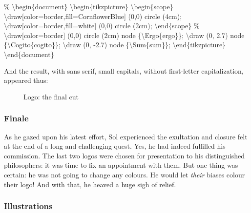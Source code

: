 \documentclass[
  a4paper,
]{article}
\newenvironment{Shaded}{\begin{snugshade}}{\end{snugshade}}
\newcommand{\CommentTok}[1]{\textcolor[rgb]{0.50,0.62,0.50}{#1}}
\newcommand{\ExtensionTok}[1]{\textcolor[rgb]{0.80,0.80,0.80}{#1}}
\newcommand{\FunctionTok}[1]{\textcolor[rgb]{0.94,0.94,0.56}{#1}}
\newcommand{\KeywordTok}[1]{\textcolor[rgb]{0.94,0.87,0.69}{#1}}
\newcommand{\NormalTok}[1]{\textcolor[rgb]{0.80,0.80,0.80}{#1}}
\begin{document}
\begin{Shaded}
\begin{Highlighting}[]
\CommentTok{\%}
\KeywordTok{\textbackslash{}begin}\NormalTok{\{}\ExtensionTok{document}\NormalTok{\}}
\KeywordTok{\textbackslash{}begin}\NormalTok{\{}\ExtensionTok{tikzpicture}\NormalTok{\}}
\KeywordTok{\textbackslash{}begin}\NormalTok{\{}\ExtensionTok{scope}\NormalTok{\}}
\FunctionTok{\textbackslash{}draw}\NormalTok{[color=border,fill=CornflowerBlue] (0,0) circle (4cm);}
\FunctionTok{\textbackslash{}draw}\NormalTok{[color=border,fill=white] (0,0) circle (2cm);}
\KeywordTok{\textbackslash{}end}\NormalTok{\{}\ExtensionTok{scope}\NormalTok{\}}
\CommentTok{\%}
\FunctionTok{\textbackslash{}draw}\NormalTok{[color=border] (0,0) circle (2cm) node \{}\FunctionTok{\textbackslash{}Ergo}\NormalTok{\{ergo\}\};}
\FunctionTok{\textbackslash{}draw}\NormalTok{ (0, 2.7) node \{}\FunctionTok{\textbackslash{}Cogito}\NormalTok{\{cogito\}\};}
\FunctionTok{\textbackslash{}draw}\NormalTok{ (0, {-}2.7) node \{}\FunctionTok{\textbackslash{}Sum}\NormalTok{\{sum\}\};}
\KeywordTok{\textbackslash{}end}\NormalTok{\{}\ExtensionTok{tikzpicture}\NormalTok{\}}
\KeywordTok{\textbackslash{}end}\NormalTok{\{}\ExtensionTok{document}\NormalTok{\}}
\end{Highlighting}
\end{Shaded}

And the result, with sans serif, small capitals, without first-letter
capitalization, appeared thus:

\begin{figure}
\centering

\caption{Logo: the final cut}
\end{figure}

\hypertarget{finale}{%
\subsubsection{Finale}\label{finale}}

As he gazed upon his latest effort, Sol experienced the exultation and
closure felt at the end of a long and challenging quest. Yes, he had
indeed fulfilled his commission. The last two logos were chosen for
presentation to his distinguished philosophers: it was time to fix an
appointment with them. But one thing was certain: he was not going to
change any colours. He would let \emph{their} biases colour their logo!
And with that, he heaved a huge sigh of relief.

\hypertarget{illustrations}{%
\subsubsection{Illustrations}\label{illustrations}}
\end{document}
